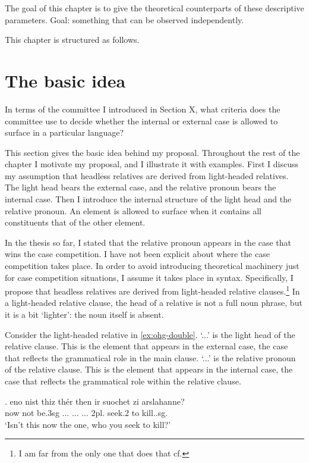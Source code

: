 The goal of this chapter is to give the theoretical counterparts of these descriptive parameters. Goal: something that can be observed independently.

This chapter is structured as follows.


\section{The basic idea}\label{sec:basic-idea}

In terms of the committee I introduced in Section X, what criteria does the committee use to decide whether the internal or external case is allowed to surface in a particular language?

This section gives the basic idea behind my proposal. Throughout the rest of the chapter I motivate my proposal, and I illustrate it with examples. First I discuss my assumption that headless relatives are derived from light-headed relatives. The light head bears the external case, and the relative pronoun bears the internal case. Then I introduce the internal structure of the light head and the relative pronoun. An element is allowed to surface when it contains all constituents that of the other element.

In the thesis so far, I stated that the relative pronoun appears in the case that wins the case competition. I have not been explicit about where the case competition takes place. In order to avoid introducing theoretical machinery just for case competition situations, I assume it takes place in syntax.
Specifically, I propose that headless relatives are derived from light-headed relative clauses.\footnote{
I am far from the only one that does that cf.
} In a light-headed relative clause, the head of a relative is not a full noun phrase, but it is a bit `lighter': the noun itself is absent.

Consider the light-headed relative in \ref{ex:ohg-double}.
 `...' is the light head of the relative clause. This is the element that appears in the external case, the case that reflects the grammatical role in the main clause.
 `...' is the relative pronoun of the relative clause. This is the element that appears in the internal case, the case that reflects the grammatical role within the relative clause.

\exg. eno nist thiz thér then ir suochet zi arslahanne?\\
 now {not be.3\ac{sg}} ... ...
 ... 2\ac{pl}. seek.2 to kill..\ac{sg}.\\
 `Isn't this now the one, who you seek to kill?'\label{ex:ohg-double}

